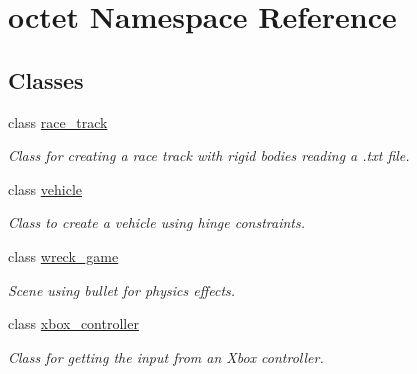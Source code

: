 \hypertarget{namespaceoctet}{\section{octet Namespace Reference}
\label{namespaceoctet}
}
\subsection*{Classes}
\begin{DoxyCompactItemize}
\item 
class \hyperlink{classoctet_1_1race__track}{race\+\_\+track}
\begin{DoxyCompactList}\small\item\em Class for creating a race track with rigid bodies reading a .txt file. \end{DoxyCompactList}\item 
class \hyperlink{classoctet_1_1vehicle}{vehicle}
\begin{DoxyCompactList}\small\item\em Class to create a vehicle using hinge constraints. \end{DoxyCompactList}\item 
class \hyperlink{classoctet_1_1wreck__game}{wreck\+\_\+game}
\begin{DoxyCompactList}\small\item\em Scene using bullet for physics effects. \end{DoxyCompactList}\item 
class \hyperlink{classoctet_1_1xbox__controller}{xbox\+\_\+controller}
\begin{DoxyCompactList}\small\item\em Class for getting the input from an Xbox controller. \end{DoxyCompactList}\end{DoxyCompactItemize}

